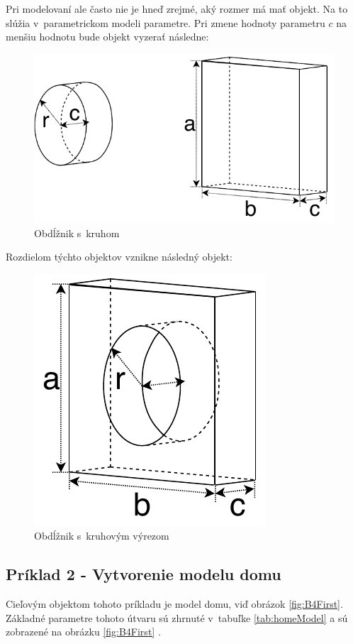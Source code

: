 Pri modelovaní ale často nie je hneď zrejmé, aký rozmer má mať objekt. Na to slúžia v~parametrickom modeli parametre. Pri zmene hodnoty parametru $c$ na menšiu hodnotu bude objekt vyzerať následne:\nopagebreak
\begin{figure}[H]
	\centering
	\includegraphics[height=0.3\textwidth]{obrazky-figures/Examples/A3x.pdf}
	\caption{Obdĺžnik s~kruhom}
	\label{fig:A3x}
\end{figure}
Rozdielom týchto objektov vznikne následný objekt:\nopagebreak
\begin{figure}[H]
	\centering
	\includegraphics[height=0.3\textwidth]{obrazky-figures/Examples/A4x.pdf}
	\caption{Obdĺžnik s~kruhovým výrezom}
	\label{fig:A4x}
\end{figure}

\subsection*{Príklad 2 - Vytvorenie modelu domu}
Cieľovým objektom tohoto príkladu je model domu, viď obrázok \ref{fig:B4First}. Základné parametre tohoto útvaru sú zhrnuté v~tabuľke \ref{tab:homeModel}  a sú zobrazené na obrázku \ref{fig:B4First}
\label{sec:homeModel}.
\nopagebreak


